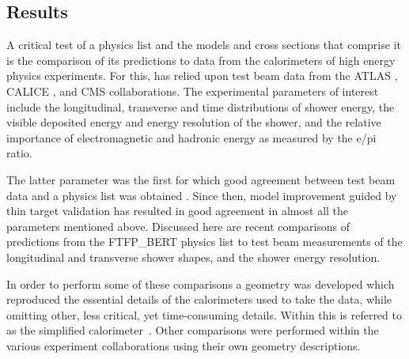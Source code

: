 \label{sec:physresult}
\subsection{\textbf{Results}}
A critical test of a physics list and the models and cross sections that 
comprise it is the comparison of its predictions to data from the calorimeters
of high energy physics experiments.  For this, \Gfour{} has relied upon test
beam data from the ATLAS \cite{bib:ATLAS}, CALICE \cite{bib:Calice}, and CMS
\cite{bib:CMS} collaborations.  The experimental parameters of interest include
the longitudinal, transverse and time distributions of shower energy, the 
visible deposited energy and energy resolution of the shower, and the relative 
importance of electromagnetic and hadronic energy as measured by the e/pi ratio.  

The latter parameter was the first for which good agreement between test beam 
data and a \Gfour{} physics list was obtained \cite{bib:generalpaper2}.  Since 
then, model improvement guided by thin target validation has resulted in good 
agreement in almost all the parameters mentioned above.  Discussed here are 
recent comparisons of predictions from the FTFP\_BERT physics list to test beam 
measurements of the longitudinal and transverse shower shapes, and the shower 
energy resolution.

In order to perform some of these comparisons a \Gfour{} geometry was developed 
which reproduced the essential details of the calorimeters used to take the 
data, while omitting other, less critical, yet time-consuming details.  Within
\Gfour{} this is referred to as the simplified calorimeter~\cite{6154433}.  Other
comparisons were performed within the various experiment collaborations using 
their own \Gfour{} geometry descriptions.

